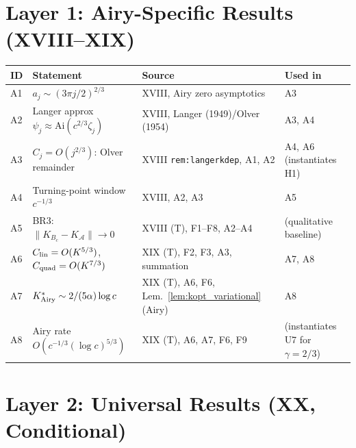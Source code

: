 \documentclass[12pt,a4paper]{amsart}
\theoremstyle{definition}
\begin{document}
\section{Layer 1: Airy-Specific Results (XVIII--XIX)}
\label{sec:L1}

\begin{center}
\renewcommand{\arraystretch}{1.3}
\begin{tabular}{l l l l}
\toprule
\textbf{ID} & \textbf{Statement} & \textbf{Source} & \textbf{Used in} \\
\midrule
A1 & $a_j\sim(3\pi j/2)^{2/3}$
  & XVIII, Airy zero asymptotics
  & A3 \\
A2 & Langer approx $\psi_j\approx\mathrm{Ai}(c^{2/3}\zeta_j)$
  & XVIII, Langer (1949)/Olver (1954)
  & A3, A4 \\
A3 & $C_j = O(j^{2/3})$: Olver remainder
  & XVIII \texttt{rem:langerkdep}, A1, A2
  & A4, A6 (instantiates H1) \\
A4 & Turning-point window $c^{-1/3}$
  & XVIII, A2, A3
  & A5 \\
A5 & BR3: $\|K_{B_c}-K_{\mathcal{A}}\|\to 0$
  & XVIII (T), F1--F8, A2--A4
  & (qualitative baseline) \\
A6 & $C_{\rm lin}=O(K^{5/3})$, $C_{\rm quad}=O(K^{7/3})$
  & XIX (T), F2, F3, A3, summation
  & A7, A8 \\
A7 & $K^*_{\rm Airy}\sim 2/(5\alpha)\log c$
  & XIX (T), A6, F6,
    Lem.~\ref{lem:kopt_variational} (Airy)
  & A8 \\
A8 & Airy rate $O(c^{-1/3}(\log c)^{5/3})$
  & XIX (T), A6, A7, F6, F9
  & (instantiates U7 for $\gamma=2/3$) \\
\bottomrule
\end{tabular}
\end{center}

\section{Layer 2: Universal Results (XX, Conditional)}
\label{sec:L2}
\end{document}

